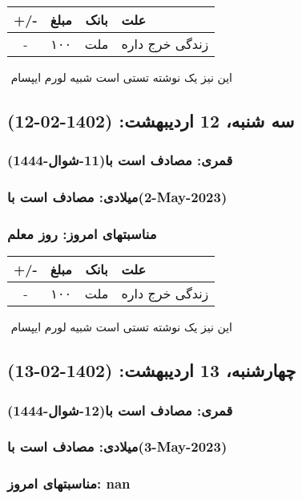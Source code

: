 \documentclass{article}
\newcommand{\rnote}[1]{\marginpar{\textcolor{color}{\StrSubstitute{\##1}{ }{\_}}}}
\newcommand{\myRow}[4]{
    #1 & #2 & #3 & #4 \\ \hline
}
\begin{document}
\begin{tabular}{ | c | c | c | p{5cm} |}
    \hline
    \myRow{ +/- }{مبلغ}{بانک}{علت}
    \myRow{-}{۱۰۰}{ملت}{زندگی خرج داره}
\end{tabular}
\newline
\newline

‌
\rnote{تست}
این نیز یک نوشته تستی است شبیه لورم ایپسام




\newpage
{}
\textcolor{color}{
\section{ سه شنبه، 12 اردیبهشت: (1402-02-12) }
\subsubsection*{قمری: مصادف است با(11-شوال-1444)} 
\subsubsection*{میلادی: مصادف است با(2-May-2023)}
\subsubsection*{مناسبتهای امروز: روز معلم}
}


\begin{tabular}{ | c | c | c | p{5cm} |}
    \hline
    \myRow{ +/- }{مبلغ}{بانک}{علت}
    \myRow{-}{۱۰۰}{ملت}{زندگی خرج داره}
\end{tabular}
\newline
\newline

‌
\rnote{تست}
این نیز یک نوشته تستی است شبیه لورم ایپسام




\newpage
{}
\textcolor{color}{
\section{ چهارشنبه، 13 اردیبهشت: (1402-02-13) }
\subsubsection*{قمری: مصادف است با(12-شوال-1444)} 
\subsubsection*{میلادی: مصادف است با(3-May-2023)}
\subsubsection*{مناسبتهای امروز: nan}
}
\end{document}
